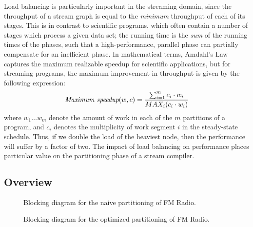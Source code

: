 Load balancing is particularly important in the streaming domain,
since the throughput of a stream graph is equal to the {\it minimum}
throughput of each of its stages.  This is in contrast to scientific
programs, which often contain a number of stages which process a given
data set; the running time is the {\it sum} of the running times of
the phases, such that a high-performance, parallel phase can partially
compensate for an inefficient phase.  In mathematical terms, Amdahl's
Law captures the maximum realizable speedup for scientific
applications, but for streaming programs, the maximum improvement in
throughput is given by the following expression:
\begin{align*}
\mbox{\it Maximum speedup}(w, c) = \frac{\sum_{i=1}^m{c_i \cdot w_i}}{MAX_i(c_i \cdot w_i)}
\end{align*}
where $w_1 \dots w_m$ denote the amount of work in each of the $m$
partitions of a program, and $c_i$ denotes the multiplicity of work
segment $i$ in the steady-state schedule.  Thus, if we double the load
of the heaviest node, then the performance will suffer by a factor of
two.  The impact of load balancing on performance places particular
value on the partitioning phase of a stream compiler.

\subsection{Overview}

\begin{figure}[t]
\vspace{-6pt}
\begin{minipage}{3.1in}
\vspace{-12pt}
\caption{\protect\small Blocking diagram for the naive partitioning of
 FM Radio.
\protect\label{fig:fmblood1}}
\end{minipage}
\hspace{0.3in}
\vspace{-12pt}
\begin{minipage}{3.1in}
\caption{\protect\small Blocking diagram for the optimized
partitioning of FM Radio.
\protect\label{fig:fmblood2}}
\end{minipage}
\vspace{-6pt}
\end{figure}

